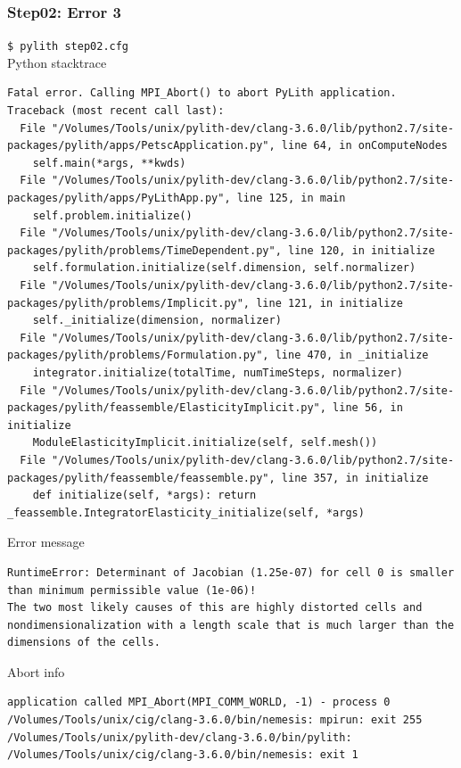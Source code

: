 \documentclass[aspectration=169]{beamer}
\newcommand{\cmd}[1]{{\footnotesize\tt \color{ltred}#1}}
\newcommand{\errlabel}[1]{{\small \color{blue}#1}}
\begin{document}
\begin{frame}[fragile]
  \frametitle{Step02: Error 3}

\cmd{\$ pylith step02.cfg}\\
\errlabel{Python stacktrace}
\begin{lstlisting}
Fatal error. Calling MPI_Abort() to abort PyLith application.
Traceback (most recent call last):
  File "/Volumes/Tools/unix/pylith-dev/clang-3.6.0/lib/python2.7/site-packages/pylith/apps/PetscApplication.py", line 64, in onComputeNodes
    self.main(*args, **kwds)
  File "/Volumes/Tools/unix/pylith-dev/clang-3.6.0/lib/python2.7/site-packages/pylith/apps/PyLithApp.py", line 125, in main
    self.problem.initialize()
  File "/Volumes/Tools/unix/pylith-dev/clang-3.6.0/lib/python2.7/site-packages/pylith/problems/TimeDependent.py", line 120, in initialize
    self.formulation.initialize(self.dimension, self.normalizer)
  File "/Volumes/Tools/unix/pylith-dev/clang-3.6.0/lib/python2.7/site-packages/pylith/problems/Implicit.py", line 121, in initialize
    self._initialize(dimension, normalizer)
  File "/Volumes/Tools/unix/pylith-dev/clang-3.6.0/lib/python2.7/site-packages/pylith/problems/Formulation.py", line 470, in _initialize
    integrator.initialize(totalTime, numTimeSteps, normalizer)
  File "/Volumes/Tools/unix/pylith-dev/clang-3.6.0/lib/python2.7/site-packages/pylith/feassemble/ElasticityImplicit.py", line 56, in initialize
    ModuleElasticityImplicit.initialize(self, self.mesh())
  File "/Volumes/Tools/unix/pylith-dev/clang-3.6.0/lib/python2.7/site-packages/pylith/feassemble/feassemble.py", line 357, in initialize
    def initialize(self, *args): return _feassemble.IntegratorElasticity_initialize(self, *args)
\end{lstlisting}
\errlabel{Error message}
\begin{lstlisting}
RuntimeError: Determinant of Jacobian (1.25e-07) for cell 0 is smaller than minimum permissible value (1e-06)!
The two most likely causes of this are highly distorted cells and nondimensionalization with a length scale that is much larger than the dimensions of the cells.
\end{lstlisting}
\errlabel{Abort info}
\begin{lstlisting}
application called MPI_Abort(MPI_COMM_WORLD, -1) - process 0
/Volumes/Tools/unix/cig/clang-3.6.0/bin/nemesis: mpirun: exit 255
/Volumes/Tools/unix/pylith-dev/clang-3.6.0/bin/pylith: /Volumes/Tools/unix/cig/clang-3.6.0/bin/nemesis: exit 1
\end{lstlisting}
  
\end{frame}
\end{document}

